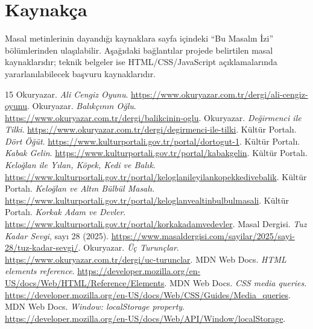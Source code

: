 \documentclass[12pt,a4paper]{article}
\begin{document}
\section{Kaynakça}
Masal metinlerinin dayandığı kaynaklara sayfa içindeki ``Bu Masalın İzi'' bölümlerinden ulaşılabilir. Aşağıdaki bağlantılar projede belirtilen masal kaynaklarıdır; teknik belgeler ise HTML/CSS/JavaScript açıklamalarında yararlanılabilecek başvuru kaynaklarıdır.
{\small
\begin{thebibliography}{15}
 Okuryazar. \emph{Ali Cengiz Oyunu}. \url{https://www.okuryazar.com.tr/dergi/ali-cengiz-oyunu}.
 Okuryazar. \emph{Balıkçının Oğlu}. \url{https://www.okuryazar.com.tr/dergi/balikcinin-oglu}.
 Okuryazar. \emph{Değirmenci ile Tilki}. \url{https://www.okuryazar.com.tr/dergi/degirmenci-ile-tilki}.
 Kültür Portalı. \emph{Dört Öğüt}. \url{https://www.kulturportali.gov.tr/portal/dortogut-1}.
 Kültür Portalı. \emph{Kabak Gelin}. \url{https://www.kulturportali.gov.tr/portal/kabakgelin}.
 Kültür Portalı. \emph{Keloğlan ile Yılan, Köpek, Kedi ve Balık}. \url{https://www.kulturportali.gov.tr/portal/keloglanileyilankopekkedivebalik}.
 Kültür Portalı. \emph{Keloğlan ve Altın Bülbül Masalı}. \url{https://www.kulturportali.gov.tr/portal/keloglanvealtinbulbulmasali}.
 Kültür Portalı. \emph{Korkak Adam ve Devler}. \url{https://www.kulturportali.gov.tr/portal/korkakadamvedevler}.
 Masal Dergisi. \emph{Tuz Kadar Sevgi}, sayı 28 (2025). \url{https://www.masaldergisi.com/sayilar/2025/sayi-28/tuz-kadar-sevgi/}.
 Okuryazar. \emph{Üç Turunçlar}. \url{https://www.okuryazar.com.tr/dergi/uc-turunclar}.
 MDN Web Docs. \emph{HTML elements reference}. \url{https://developer.mozilla.org/en-US/docs/Web/HTML/Reference/Elements}.
 MDN Web Docs. \emph{CSS media queries}. \url{https://developer.mozilla.org/en-US/docs/Web/CSS/Guides/Media_queries}.
 MDN Web Docs. \emph{Window: localStorage property}. \url{https://developer.mozilla.org/en-US/docs/Web/API/Window/localStorage}.
\end{thebibliography}}

\appendix
\end{document}

